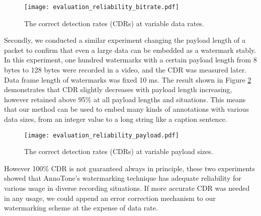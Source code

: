 \begin{figure}[htbp]
 \begin{center}
  \texttt{[image: evaluation\_reliability\_bitrate.pdf]}
 \end{center}
 \caption{The correct detection rates (CDRs) at variable data rates.}
 \label{fig:eval_reli_btrt}
\end{figure}

Secondly, we conducted a similar experiment changing the payload length of a packet to confirm that even a large data can be embedded as a watermark stably.
In this experiment, one hundred watermarks with a certain payload length from 8 bytes to 128 bytes were recorded in a video, and the CDR was measured later.
Data frame length of watermarks was fixed 10 ms.
The result shown in Figure \ref{fig:eval_reli_pyld} demonstrates that CDR slightly decreases with payload length increasing, however retained above 95\% at all payload lengths and situations.
This means that our method can be used to embed many kinds of annotations with various data sizes, from an integer value to a long string like a caption sentence.

\begin{figure}[htbp]
 \begin{center}
  \texttt{[image: evaluation\_reliability\_payload.pdf]}
 \end{center}
 \caption{The correct detection rates (CDRs) at variable payload sizes.}
 \label{fig:eval_reli_pyld}
\end{figure}

However 100\% CDR is not guaranteed always in principle, these two experiments showed that AnnoTone's watermarking technique has adequate reliability for various usage in diverse recording situations.
If more accurate CDR was needed in any usage, we could append an error correction mechanism to our watermarking scheme at the expense of data rate.
